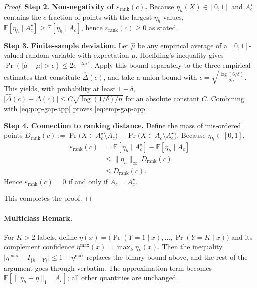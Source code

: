 \begin{proof}
\textbf{Step 2.  Non‑negativity of \(\varepsilon_{\mathrm{rank}}(c)\).}
Because \(\eta_h(X)\in[0,1]\) and
\(A_c^{\star}\) contains the \(c\)-fraction of points with the
largest \(\eta_h\)-values,
\(\mathbb E[\eta_h\mid A_c^{\star}]
 \ge\mathbb E[\eta_h\mid A_c]\),
hence \(\varepsilon_{\mathrm{rank}}(c)\ge0\) as stated.

\textbf{Step 3.  Finite‑sample deviation.}
Let \(\widehat{\mu}\) be any empirical average of a
\([0,1]\)-valued random variable with expectation \(\mu\).
Hoeffding’s inequality gives
\(\Pr(\lvert\widehat{\mu}-\mu\rvert>\epsilon)
   \le 2e^{-2n\epsilon^2}\).
Apply this bound separately to the three empirical estimates that
constitute \(\widehat{\Delta}(c)\), and take a union bound with
\(\epsilon=\sqrt{\tfrac{\log(6/\delta)}{2n}}\).
This yields, with probability at least \(1-\delta\),
\(
  \lvert\widehat{\Delta}(c)-\Delta(c)\rvert
  \le C\sqrt{\log(1/\delta)/n}
\)
for an absolute constant \(C\).
Combining with \eqref{eq:pop-gap-app} proves
\eqref{eq:emp-gap-app}.

\textbf{Step 4.  Connection to ranking distance.}
Define the mass of mis‑ordered points
\(D_{\mathrm{rank}}(c):=
 \Pr\bigl(X\in A_c^{\star}\setminus A_c\bigr)
 +\Pr\bigl(X\in A_c\setminus A_c^{\star}\bigr)\).
Because \(\eta_h\in[0,1]\),
\begin{align}
\varepsilon_{\mathrm{rank}}(c)
&=\mathbb E[\eta_h\mid A_c^{\star}]
  -\mathbb E[\eta_h\mid A_c]   \\[2pt]
&\le\bigl\|\eta_h\bigr\|_{\infty}\,
       D_{\mathrm{rank}}(c)        \\[2pt]
&\le D_{\mathrm{rank}}(c).
\end{align}
Hence \(\varepsilon_{\mathrm{rank}}(c)=0\)
if and only if \(A_c=A_c^{\star}\).

\smallskip\noindent
This completes the proof.
\end{proof}

\paragraph{Multiclass Remark.}
For \(K>2\) labels, define
\(\eta(x)=\bigl(\Pr(Y=1\mid x),\dots,\Pr(Y=K\mid x)\bigr)\)
and its complement confidence
\(\eta^{\max}(x)=\max_{k}\eta_k(x)\).
Then the inequality
\(\lvert\eta^{\max}-I_{\{h=Y\}}\rvert
 \le 1-\eta^{\max}\)
replaces the binary bound above, and the rest of the argument
goes through verbatim.  The approximation term becomes
\(\mathbb E[\lVert\eta_h-\eta\rVert_1\mid A_c]\);
all other quantities are unchanged.



